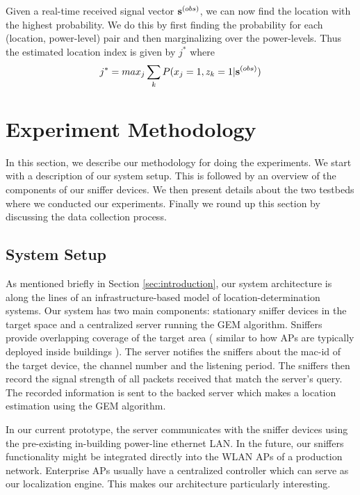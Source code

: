 \documentclass{Localization-PaperWriteupDraft}
\begin{document}
Given a real-time received signal vector ${\bf {s}}^{(obs)}$, we can now find the location with the highest probability. We do this by first finding the probability for each (location, power-level) pair and then marginalizing over the power-levels. Thus the estimated location index is given by $j^{*}$ where
\begin{align}
j^{*} = max_{j} \sum_{k} P({x_{j}} = 1, {z_{k}} = 1 | {\bf {s}}^{(obs)}) 
\end{align}

\section{Experiment Methodology}
\label{sec:experimentmethodology}

In this section, we describe our methodology for doing the experiments. We start with a description of our system setup. This is followed by an overview of the components of our sniffer devices. We then present details about the two testbeds where we conducted our experiments. Finally we round up this section by discussing the data collection process.

\subsection{System Setup}
\label{subsec:systemsetup}

As mentioned briefly in Section \ref{sec:introduction}, our system architecture is along the lines of an infrastructure-based model of location-determination systems. Our system has two main components: stationary sniffer devices in the target space and a centralized server running the GEM algorithm. Sniffers provide overlapping coverage of the target area ( similar to how APs are typically deployed inside buildings ). The server notifies the sniffers about the mac-id of the target device, the channel number and the listening period. The sniffers then record the signal strength of all packets received that match the server's query. The recorded information is sent to the backed server which makes a location estimation using the GEM algorithm.

In our current prototype, the server communicates with the sniffer devices using the pre-existing in-building power-line ethernet LAN. In the future, our sniffers functionality might be integrated directly into the WLAN APs of a production network. Enterprise APs usually have a centralized controller which can serve as our localization engine. This makes our architecture particularly interesting.
\end{document}
